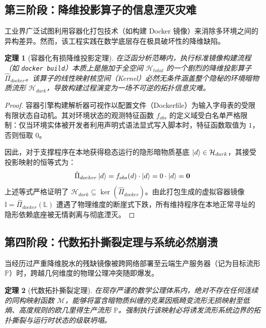 \documentclass[journal]{IEEEtran}
\newtheorem{theorem}{定理}
\begin{document}
\subsection{第三阶段：降维投影算子的信息湮灭灾难}
工业界广泛试图利用容器化打包技术（如构建 Docker 镜像）来消除多环境之间的异构差异。然而，该工程实践在数学底层存在极具破坏性的降维缺陷。

\begin{theorem}[容器化有损降维投影定理]
在泛函分析范畴内，执行标准镜像构建流程（如 \texttt{docker build}）本质上是施加于全空间 $\mathcal{H}_{total}$ 的一个剧烈的降维投影算子 $\hat{\Pi}_{docker}$。该算子的线性映射核空间（Kernel）必然无条件涵盖整个隐秘的环境暗物质流形 $\mathcal{H}_{dark}$，导致构建过程演变为一场不可逆的拓扑信息灾难。
\end{theorem}

\begin{proof}
容器引擎构建解析器可视作以配置文件（Dockerfile）为输入字母表的受限有限状态自动机。其对环境状态的观测特征函数 $f_{obs}$ 的定义域受白名单严格限制：仅当环境实体被开发者利用声明式语法显式写入脚本时，特征函数取值为 $1$，否则恒取 $0$。

因此，对于支撑程序在本地获得稳态运行的隐形暗物质基底 $\ket{d} \in \mathcal{H}_{dark}$，其接受投影映射的恒等式为：
\begin{equation}
\hat{\Pi}_{docker} \ket{d} = f_{obs}(d) \cdot \ket{d} = 0 \cdot \ket{d} = \mathbf{0}
\end{equation}
上述等式严格证明了 $\mathcal{H}_{dark} \subseteq \ker(\hat{\Pi}_{docker})$。由此打包生成的虚拟容器镜像 $\mathbb{I} = \hat{\Pi}_{docker}(\mathbb{L})$ 遭遇了物理维度的断崖式下跌，所有维持程序在本地正常寻址的隐形依赖底座被无情剥离与彻底湮灭。
\end{proof}

\subsection{第四阶段：代数拓扑撕裂定理与系统必然崩溃}
当经历过严重降维脱水的残缺镜像被跨网络部署至云端生产服务器（记为目标流形 $\mathbb{P}$）时，跨越几何维度的物理公理冲突随即爆发。

\begin{theorem}[代数拓扑撕裂定理]
在现存严谨的数学公理体系内，绝对不存在任何连续的同构映射函数 $\mathcal{M}$，能够将富含暗物质纠缠的克莱因瓶畸变流形无损映射至低熵、高度规则的欧几里得生产流形 $\mathbb{P}$。强制执行该映射必将诱发流形系统边界的拓扑撕裂与运行时状态的级联坍塌。
\end{theorem}
\end{document}
